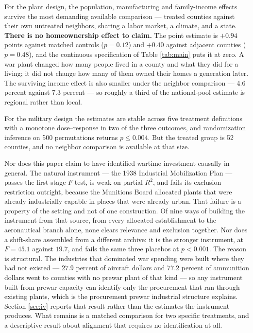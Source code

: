 \documentclass[12pt]{article}
\begin{document}
For the plant design, the population, manufacturing and family-income effects
survive the most demanding available comparison --- treated counties against
their own untreated neighbors, sharing a labor market, a climate, and a state.
\textbf{There is no homeownership effect to claim.} The point estimate is
$+0.94$ points against matched controls ($p = 0.12$) and $+0.40$ against
adjacent counties ($p = 0.48$), and the continuous specification of
Table \ref{tab:main} puts it at zero. A war plant changed how many people lived
in a county and what they did for a living; it did not change how many of them
owned their homes a generation later. The surviving income effect is also
smaller under the neighbor comparison --- 4.6 percent against 7.3 percent ---
so roughly a third of the national-pool estimate is regional rather than local.

For the military design the estimates are stable across five treatment
definitions with a monotone dose--response in two of the three outcomes, and
randomization inference on 500
permutations returns $p \leq 0.004$. But the treated group is 52 counties, and
no neighbor comparison is available at that size.

Nor does this paper claim to have identified wartime investment causally in general.
The natural instrument --- the 1938 Industrial Mobilization Plan --- passes the
first-stage $F$ test, is weak on partial $R^2$, and fails its exclusion
restriction outright, because the Munitions Board
allocated plants that were already industrially capable in places that were
already urban. That failure is a property of the setting and not of one
construction. Of nine ways of building the instrument from that source, from
every allocated establishment to the aeronautical branch alone, none clears
relevance and exclusion together. Nor does a shift-share assembled from a
different archive: it is the stronger instrument, at $F = 45.1$ against $19.7$,
and fails the same three placebos at $p<0.001$. The reason is structural. The
industries that dominated war spending were built where they had not existed ---
27.9 percent of aircraft dollars and 77.2 percent of ammunition dollars went to
counties with no prewar plant of that kind --- so any instrument built from
prewar capacity can identify only the procurement that ran through existing
plants, which is the procurement prewar industrial structure explains. Section \ref{sec:iv} reports that result rather than the estimates
the instrument produces. What remains is a matched comparison for two specific
treatments, and a descriptive result about alignment that requires no
identification at all.
\end{document}
